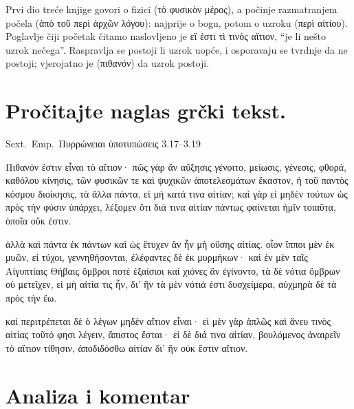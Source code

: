 Prvi dio treće knjige govori o fizici \textgreek[variant=ancient]{(τὸ φυσικὸν μέρος)}, a počinje razmatranjem počela \textgreek[variant=ancient]{(ἀπὸ τοῦ περὶ ἀρχῶν λόγου)}: najprije o bogu, potom o uzroku \textgreek[variant=ancient]{(περὶ αἰτίου).} Poglavlje čiji početak čitamo naslovljeno je \textgreek[variant=ancient]{εἴ ἐστι τὶ τινὸς αἴτιον,} ``je li nešto uzrok nečega''. Raspravlja se postoji li uzrok uopće, i osporavaju se tvrdnje da ne postoji; vjerojatno je \textgreek[variant=ancient]{(πιθανόν)} da uzrok postoji.



\section*{Pročitajte naglas grčki tekst.}

Sext.\ Emp.\ Πυρρώνειαι ὑποτυπώσεις 3.17–3.19


\medskip


{\large

\begin{greek}

\noindent  Πιθανόν ἐστιν εἶναι τὸ αἴτιον· πῶς γὰρ ἂν αὔξησις γένοιτο, μείωσις, γένεσις, φθορά, καθόλου κίνησις, τῶν φυσικῶν τε καὶ ψυχικῶν ἀποτελεσμάτων ἕκαστον, ἡ τοῦ παντὸς κόσμου διοίκησις, τὰ ἄλλα πάντα, εἰ μὴ κατά τινα αἰτίαν; καὶ γὰρ εἰ μηδὲν τούτων ὡς πρὸς τὴν φύσιν ὑπάρχει, λέξομεν ὅτι διά τινα αἰτίαν πάντως φαίνεται ἡμῖν τοιαῦτα, ὁποῖα οὔκ ἐστιν.

\noindent  ἀλλὰ καὶ πάντα ἐκ πάντων καὶ ὡς ἔτυχεν ἂν ἦν μὴ οὔσης αἰτίας. οἷον ἵπποι μὲν ἐκ μυῶν, εἰ τύχοι, γεννηθήσονται, ἐλέφαντες δὲ ἐκ μυρμήκων· καὶ ἐν μὲν ταῖς Αἰγυπτίαις Θήβαις ὄμβροι ποτὲ ἐξαίσιοι καὶ χιόνες ἂν ἐγίνοντο, τὰ δὲ νότια ὄμβρων οὐ μετεῖχεν, εἰ μὴ αἰτία τις ἦν, δι’ ἣν τὰ μὲν νότιά ἐστι δυσχείμερα, αὐχμηρὰ δὲ τὰ πρὸς τὴν ἔω.

\noindent  καὶ περιτρέπεται δὲ ὁ λέγων μηδὲν αἴτιον εἶναι· εἰ μὲν γὰρ ἁπλῶς καὶ ἄνευ τινὸς αἰτίας τοῦτό φησι λέγειν, ἄπιστος ἔσται· εἰ δὲ διά τινα αἰτίαν, βουλόμενος ἀναιρεῖν τὸ αἴτιον τίθησιν, ἀποδιδόσθω αἰτίαν δι’ ἣν οὐκ ἔστιν αἴτιον.

\end{greek}

}


\section*{Analiza i komentar}

